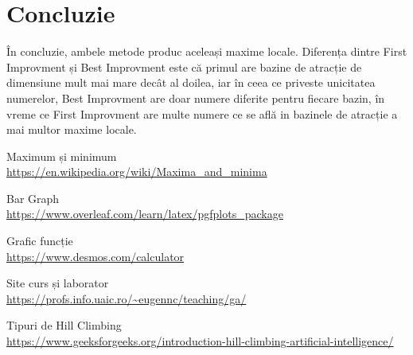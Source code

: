 \documentclass{article}
\begin{document}
\section{Concluzie}
În concluzie, ambele metode produc aceleași maxime locale. Diferența dintre First Improvment și Best Improvment este că primul are bazine de atracție de dimensiune mult mai mare decât al doilea, iar în ceea ce priveste unicitatea numerelor, Best Improvment are doar numere diferite pentru fiecare bazin, în vreme ce First Improvment are multe numere ce se află in bazinele de atracție a mai multor maxime locale.



\begin{thebibliography}{9}

  Maximum și minimum\\
  \url{https://en.wikipedia.org/wiki/Maxima_and_minima}
  
  Bar Graph\\
  \url{https://www.overleaf.com/learn/latex/pgfplots_package}

  Grafic funcție\\
  \url{https://www.desmos.com/calculator}
  
  Site curs și laborator\\
  \url{https://profs.info.uaic.ro/~eugennc/teaching/ga/}
  
  Tipuri de Hill Climbing\\
  \url{https://www.geeksforgeeks.org/introduction-hill-climbing-artificial-intelligence/}

\end{thebibliography}  
\end{document}
